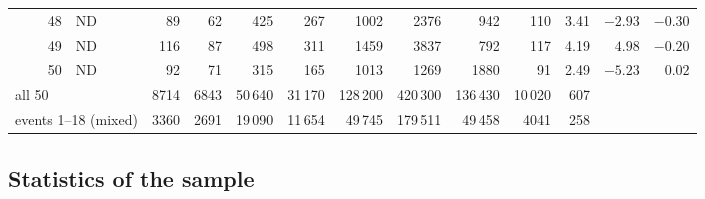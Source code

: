 \documentclass[11pt,a4paper]{article}
\begin{document}
\begin{longtable}{rlrrrrrrrrrrr}
48 & ND &  89 &  62 &  425 &  267 &  1002 &  2376 &   942 &  110 &  3.41 & $-2.93$ & $-0.30$ \\
49 & ND & 116 &  87 &  498 &  311 &  1459 &  3837 &   792 &  117 &  4.19 &  $4.98$ & $-0.20$ \\
50 & ND &  92 &  71 &  315 &  165 &  1013 &  1269 &  1880 &   91 &  2.49 & $-5.23$ &  $0.02$ \\
\midrule
\multicolumn{2}{l}{all 50} & 8714 & 6843 & 50\,640 & 31\,170 & 128\,200 & 420\,300 & 136\,430 & 10\,020 & 607 & & \\
\multicolumn{2}{l}{events 1--18 (mixed)} & 3360 & 2691 & 19\,090 & 11\,654 & 49\,745 & 179\,511 & 49\,458 & 4041 & 258 & & \\
\end{longtable}
\endgroup

\subsection{Statistics of the sample}
\label{sec:stats}
\end{document}
